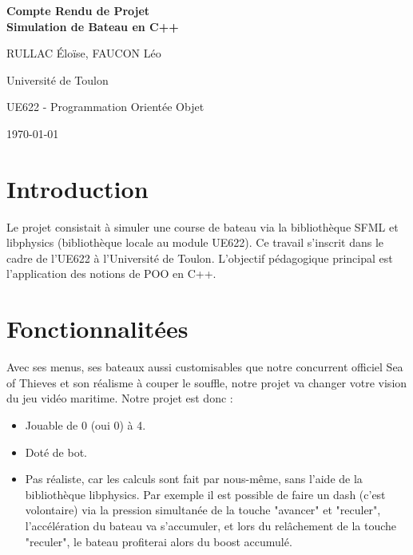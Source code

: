 \documentclass[a4paper,12pt]{article}
\begin{document}
\begin{titlepage}
    \centering
    \vspace*{\fill}

    {\Huge \bfseries Compte Rendu de Projet \\[0.5em]
    Simulation de Bateau en C++}

    \vspace{2cm}
    {\Large RULLAC Éloïse, FAUCON Léo \par}
    {\large Université de Toulon \par}
    {\large UE622 - Programmation Orientée Objet \par}
    \vspace{1.5cm}
    {\large \today}

    \vspace*{\fill}
\end{titlepage}

\section{Introduction}
Le projet consistait à simuler une course de bateau via la bibliothèque SFML et libphysics (bibliothèque locale au module UE622). Ce travail s'inscrit dans le cadre de l'UE622 à l'Université de Toulon. L'objectif pédagogique principal est l'application des notions de POO en C++.

\section {Fonctionnalitées}
Avec ses menus, ses bateaux aussi customisables que notre concurrent officiel Sea of Thieves et
son réalisme à couper le souffle, notre projet va changer votre vision du jeu vidéo maritime.
Notre projet est donc : 
\begin{itemize}
    \item Jouable de 0 (oui 0) à 4.
    \item Doté de bot.
    \item Pas réaliste, car les calculs sont fait par nous-même,
     sans l'aide de la bibliothèque libphysics.
    Par exemple il est possible de faire un dash (c'est volontaire)
    via la pression simultanée de la touche "avancer" et "reculer",
    l'accélération du bateau va s'accumuler,
    et lors du relâchement de la touche "reculer", le bateau profiterai alors du boost accumulé.
\end{itemize}
\end{document}
